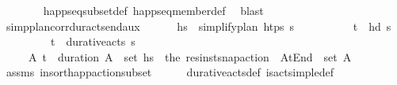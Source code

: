 \begin{isabellebody}
\ \ \ \ \ \ \isamarkupfalse%
\ happ{\isacharunderscore}{\kern0pt}seq{\isacharunderscore}{\kern0pt}subset{\isacharunderscore}{\kern0pt}def\ happ{\isacharunderscore}{\kern0pt}seq{\isacharunderscore}{\kern0pt}member{\isacharunderscore}{\kern0pt}def\ \isamarkupfalse%
\ blast\isanewline
\ \ \isamarkupfalse%
%
\endisatagproof
{\isafoldproof}%
%
\isadelimproof
\isanewline
%
\endisadelimproof
\isanewline
\ \ \isamarkupfalse%
\ simp{\isacharunderscore}{\kern0pt}plan{\isacharunderscore}{\kern0pt}corr{\isacharunderscore}{\kern0pt}dur{\isacharunderscore}{\kern0pt}acts{\isacharunderscore}{\kern0pt}end{\isacharunderscore}{\kern0pt}aux{\isacharcolon}{\kern0pt}\ \isanewline
\ \ \ \ \ {\isachardoublequoteopen}hs\ {\isacharequal}{\kern0pt}\ simplify{\isacharunderscore}{\kern0pt}plan\ htps\ {\isasympi}s{\isachardoublequoteclose}\ \isanewline
\ \ \ \ \ \ \ \ \ {\isachardoublequoteopen}{\isacharparenleft}{\kern0pt}t\isactrlsub {\isasympi}{\isacharcomma}{\kern0pt}{\isasympi}{\isacharparenright}{\kern0pt}\ {\isacharequal}{\kern0pt}\ hd\ {\isasympi}s{\isachardoublequoteclose}\ \isanewline
\ \ \ \ \ \ \ \ \ {\isachardoublequoteopen}{\isacharparenleft}{\kern0pt}t\isactrlsub {\isasympi}{\isacharcomma}{\kern0pt}{\isasympi}{\isacharparenright}{\kern0pt}\ {\isasymin}\ durative{\isacharunderscore}{\kern0pt}acts\ {\isasympi}s{\isachardoublequoteclose}\isanewline
\ \ \ \ \ {\isachardoublequoteopen}{\isacharparenleft}{\kern0pt}{\isasymexists}A{\isachardot}{\kern0pt}\ {\isacharparenleft}{\kern0pt}t\isactrlsub {\isasympi}\ {\isacharplus}{\kern0pt}\ {\isacharparenleft}{\kern0pt}duration\ {\isasympi}{\isacharparenright}{\kern0pt}{\isacharcomma}{\kern0pt}A{\isacharparenright}{\kern0pt}\ {\isasymin}\ set\ hs\ {\isasymand}\ {\isacharparenleft}{\kern0pt}the\ {\isacharparenleft}{\kern0pt}res{\isacharunderscore}{\kern0pt}inst{\isacharunderscore}{\kern0pt}snap{\isacharunderscore}{\kern0pt}action\ {\isasympi}\ At{\isacharunderscore}{\kern0pt}End{\isacharparenright}{\kern0pt}{\isacharparenright}{\kern0pt}\ {\isasymin}\ set\ A{\isacharparenright}{\kern0pt}{\isachardoublequoteclose}\isanewline
%
\isadelimproof
\ \ \ \ %
\endisadelimproof
%
\isatagproof
{}\isamarkupfalse%
\ assms\ insort{\isacharunderscore}{\kern0pt}happ{}{\isacharunderscore}{\kern0pt}action{\isacharunderscore}{\kern0pt}subset\isanewline
\ \ \ \ \isamarkupfalse%
\ durative{\isacharunderscore}{\kern0pt}acts{\isacharunderscore}{\kern0pt}def\ is{\isacharunderscore}{\kern0pt}act{\isacharunderscore}{\kern0pt}simple{\isacharunderscore}{\kern0pt}def\isanewline

\end{isabellebody}
